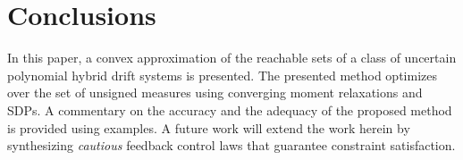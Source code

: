 \section{Conclusions}
In this paper, a convex approximation of the reachable sets of a class of uncertain polynomial hybrid drift systems is presented. The presented method optimizes over the set of unsigned measures using converging moment relaxations and SDPs. A commentary on the accuracy and the adequacy of the proposed method is provided using examples. A future work will extend the work herein by synthesizing \emph{cautious} feedback control laws that guarantee constraint satisfaction. 